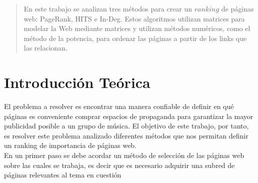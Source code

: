 \documentclass[a4paper]{article}
\begin{document}
\thispagestyle{empty}

\maketitle
\newpage

\thispagestyle{empty}
\vfill
\begin{abstract}
En este trabajo se analizan tres métodos para crear un $ranking$ de páginas web: PageRank, HITS e In-Deg. Estos algoritmos utilizan matrices para modelar la Web mediante matrices y utilizan métodos numéricos, como el método de la potencia, para ordenar las páginas a partir de los links que las relacionan. %
\end{abstract}

\thispagestyle{empty}
\vspace{3cm}
\tableofcontents
\newpage


\newpage

\section{Introducci\'{o}n Te\'{o}rica}
\label{sec:intro}

El problema a resolver es encontrar una manera confiable de definir en qué páginas es conveniente comprar espacios de propaganda para garantizar la mayor publicidad posible a un grupo de música.
El objetivo de este trabajo, por tanto, es resolver este problema analizado diferentes métodos que nos permitan definir un ranking de importancia de p\'{a}ginas web. \\

En un primer paso se debe acordar un m\'{e}todo de selecci\'{o}n de las p\'{a}ginas web sobre las cuales se trabaja, es decir que es necesario adquirir una subred de p\'{a}ginas relevantes al tema en cuesti\'{o}n
\end{document}
